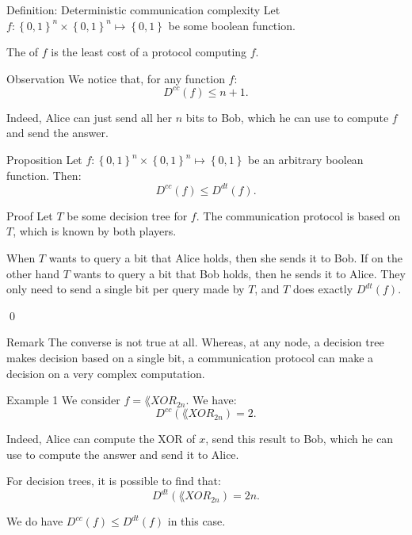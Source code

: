 \documentclass[a4paper]{article}
\begin{document}
\begin{parag}{Definition: Deterministic communication complexity}
    Let $f: \left\{0, 1\right\}^n \times \left\{0, 1\right\}^n \mapsto \left\{0, 1\right\}$ be some boolean function.
    
    The  of $f$ is the least cost of a protocol computing $f$.

    \begin{subparag}{Observation}
        We notice that, for any function $f$: 
        \[D^{cc}\left(f\right) \leq n + 1.\]
        
        Indeed, Alice can just send all her $n$ bits to Bob, which he can use to compute $f$ and send the answer.
    \end{subparag}
\end{parag}

\begin{parag}{Proposition}
    Let $f: \left\{0,1\right\}^n \times \left\{0, 1\right\}^n \mapsto \left\{0, 1\right\}$ be an arbitrary boolean function. Then: 
    \[D^{cc}\left(f\right) \leq D^{dt}\left(f\right).\]

    \begin{subparag}{Proof}
        Let $T$ be some decision tree for $f$. The communication protocol is based on $T$, which is known by both players.

        When $T$ wants to query a bit that Alice holds, then she sends it to Bob. If on the other hand $T$ wants to query a bit that Bob holds, then he sends it to Alice. They only need to send a single bit per query made by $T$, and $T$ does exactly $D^{dt}\left(f\right)$.

        \qed
    \end{subparag}

    \begin{subparag}{Remark}
        The converse is not true at all. Whereas, at any node, a decision tree makes decision based on a single bit, a communication protocol can make a decision on a very complex computation.
    \end{subparag}
\end{parag}

\begin{parag}{Example 1}
    We consider $f = \lang{XOR}_{2n}$. We have: 
    \[D^{cc}\left(\lang{XOR}_{2n}\right) = 2.\]
    
    Indeed, Alice can compute the XOR of $x$, send this result to Bob, which he can use to compute the answer and send it to Alice.

    For decision trees, it is possible to find that:
    \[D^{dt}\left(\lang{XOR}_{2n}\right) = 2n.\]

    We do have $D^{cc}\left(f\right) \leq D^{dt}\left(f\right)$ in this case.
\end{parag}
\end{document}
